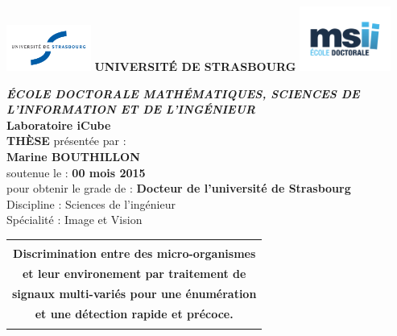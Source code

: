 
\begin{titlepage}
\hspace{-2cm}
\includegraphics[height = 1.5cm] {./Images/logo-uds.pdf}\hspace{0.3cm}
\LARGE{\textbf{\uppercase{Université de Strasbourg}}}\hspace{0.5cm}
\includegraphics[width = 3cm] {./Images/logo-msii.pdf}
\begin{center}
	\vspace{1.5cm}
	\large{\textbf{\uppercase{\textit{\'{E}cole doctorale Mathématiques, Sciences de l'Information et de l'ingénieur}}}}\\
	\large{\textbf{Laboratoire iCube}}\\
	\vspace{2.5cm}
	\huge{\uppercase{\bf Thèse}} \normalsize présentée par :\\
	\Large{\textbf{Marine BOUTHILLON}}\\
	\normalsize soutenue le : \textbf{00 mois 2015}\\
	\vspace{2cm}
	pour obtenir le grade de : \Large \textbf{Docteur de l'université de Strasbourg}\\
	\normalsize Discipline : Sciences de l'ingénieur\\
	Spécialité : Image et Vision\\
	\vspace{1cm}
	\begin{tabular}{|c|}
		\hline
		\\
		\LARGE{\textbf{Discrimination entre des micro-organismes }} \\
		\LARGE{\textbf{et leur environement par traitement de }} \\
		\LARGE{\textbf{signaux multi-variés pour une énumération}} \\
		\LARGE{\textbf{et une détection rapide et précoce.}} \\
		\\\hline
	\end{tabular}
\end{center}


\end{titlepage}
